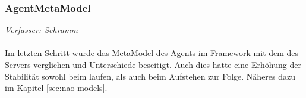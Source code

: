 \subsubsection{AgentMetaModel}
\textit{Verfasser: Schramm}\\
\\
Im letzten Schritt wurde das MetaModel des Agents im Framework mit dem des Servers verglichen und Unterschiede beseitigt. Auch dies hatte eine Erhöhung der Stabilität sowohl beim laufen, als auch beim Aufstehen zur Folge. Näheres dazu im Kapitel \ref{sec:nao-models}.
